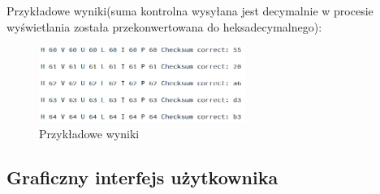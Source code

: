 \documentclass[10pt, a4paper]{article}
\begin{document}
	Przykładowe wyniki(suma kontrolna wysyłana jest decymalnie w procesie wyświetlania została przekonwertowana do heksadecymalnego):
		\begin{figure}[H]
			\centering
			\includegraphics[width=0.6\textwidth]{figures/serial_wyniki.png}
			\caption{Przykładowe wyniki}
			\label{fig:serial_wyniki}
		\end{figure}
	
	\subsection{Graficzny interfejs użytkownika}
\end{document}
